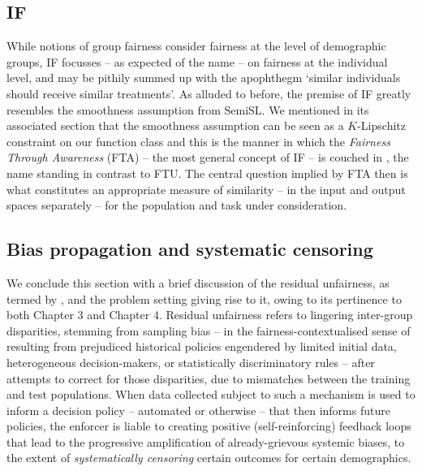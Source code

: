  \subsection{\Ac{IF}}\label{ssec:individual-fairness}
While notions of group fairness consider fairness at the level of demographic groups,
\ac{IF} focusses -- as expected of the name -- on fairness at the individual
level, and may be pithily summed up with the apophthegm `similar individuals should receive similar
treatments'.
%
As alluded to before, the premise of \ac{IF} greatly resembles the smoothness
assumption from SemiSL. 
%
We mentioned in its associated section that the smoothness assumption can be seen as a
\(K\)-Lipschitz constraint on our function class and this is the manner in which the \emph{Fairness
Through Awareness} (FTA) -- the most general concept of \ac{IF} -- is couched in
\cite{dwork2012fairness}, the name standing in contrast to FTU.
%
The central question implied by FTA then is what constitutes an appropriate measure of similarity
-- in the input and output spaces separately -- for the population and task under consideration.

\subsection{Bias propagation and systematic censoring}\label{ssec:residual-unfairness}
We conclude this section with a brief discussion of the residual unfairness, as termed by
\cite{kallus2018residual}, and the problem setting giving rise to it, owing to its pertinence to
both Chapter 3 and Chapter 4.
%
Residual unfairness refers to lingering inter-group disparities, stemming from sampling bias -- in
the fairness-contextualised sense of resulting from prejudiced historical policies engendered by
limited initial data, heterogeneous decision-makers, or statistically discriminatory rules -- after
attempts to correct for those disparities, due to mismatches between the training and test
populations.
%
When data collected subject to such a mechanism is used to inform a decision policy -- automated or
otherwise -- that then informs future policies, the enforcer is liable to creating positive
(self-reinforcing) feedback loops that lead to the progressive amplification of already-grievous
systemic biases, to the extent of \emph{systematically censoring} certain outcomes for certain
demographics.

